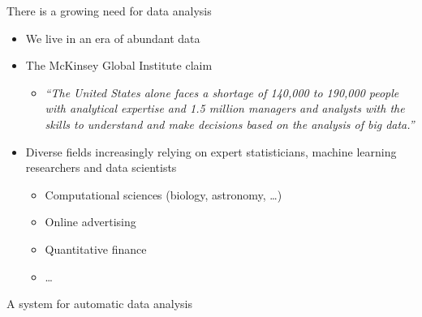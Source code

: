 \begin{frame}{There is a growing need for data analysis}
  \begin{itemize}
    \item We live in an era of abundant data
    \vspace{\baselineskip}
    \item The McKinsey Global Institute claim
    \begin{itemize}
      \item \emph{``The United States alone faces a shortage of 140,000 to 190,000 people with analytical expertise and 1.5 million managers and analysts with the skills to understand and make decisions based on the analysis of big data.''}
    \end{itemize}
    \vspace{\baselineskip}
    \item Diverse fields increasingly relying on expert statisticians, machine learning researchers and data scientists \eg
    \begin{itemize}
       \item Computational sciences (\eg biology, astronomy, \ldots)
       \item Online advertising
       \item Quantitative finance
       \item \ldots
     \end{itemize}
  \end{itemize}
\end{frame}

\begin{frame}{A system for automatic data analysis}
  
\end{frame}


